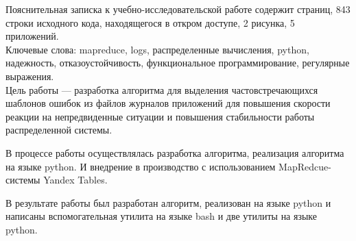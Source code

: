 \addtocounter{page}{1}
Пояснительная записка к учебно-исследовательской работе содержит
\pageref{LastPage} страниц, 843 строки исходного кода, находящегося в откром
доступе, 2 рисунка, 5 приложений.\\

Ключевые слова: mapreduce, logs, распределенные вычисления, python, надежность,
отказоустойчивость, функциональное программирование, регулярные выражения.\\

Цель работы --- разработка алгоритма для выделения частовстречающихся шаблонов
ошибок из файлов журналов приложений для повышения скорости реакции
на непредвиденные ситуации и повышения стабильности работы распределенной
системы.

В процессе работы осуществлялась разработка алгоритма, реализация алгоритма на
языке python. И внедрение в производство с использованием MapRedcue-системы
Yandex Tables.

В результате работы был разработан алгоритм, реализован на языке
python и написаны вспомогательная утилита на языке bash и две утилиты
на языке python.


